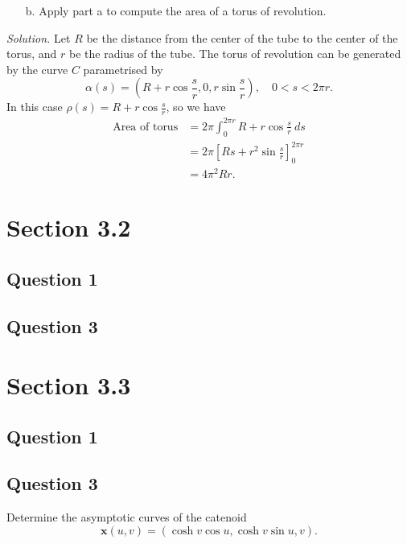 \documentclass[12pt]{article}
\begin{document}
\begin{enumerate}
    \item[b.] Apply part a to compute the area of a torus of revolution.
\end{enumerate}

\emph{Solution.}
Let \(R\) be the distance from the center of the tube to the center of the torus, and \(r\) be the radius of the tube.
The torus of revolution can be generated by the curve \(C\) parametrised by
\[ \alpha(s) = \left(R + r \cos\frac{s}{r},0,r\sin\frac{s}{r}\right), \quad 0 < s < 2\pi r.\]
In this case \(\rho(s) = R + r\cos\frac{s}{r}\),
so we have
\begin{align*}
    \text{Area of torus}
    &= 2\pi \int_0^{2\pi r} R + r\cos \frac{s}{r}\ ds \\
    &= 2\pi \left[ Rs + r^2\sin\frac{s}{r} \right]_0^{2\pi r} \\
    &= 4\pi^2 Rr.
\end{align*}


\section{Section 3.2}
\subsection*{Question 1}

\subsection*{Question 3}

\section{Section 3.3}

\subsection*{Question 1}

\subsection*{Question 3}
Determine the asymptotic curves of the catenoid
\begin{equation*}
    \mathbf{x}(u,v)= (\cosh{v}\cos{u},\cosh{v}\sin{u},v).
\end{equation*}
\end{document}
